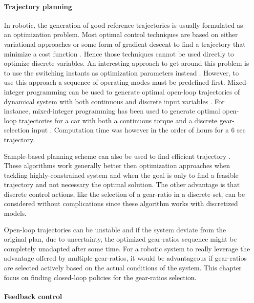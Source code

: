 \paragraph{Trajectory planning}

In robotic, the generation of good reference trajectories is usually formulated as an optimization problem. Most optimal control techniques are based on either variational approaches or some form of gradient descent to find a trajectory that minimize a cost function \cite{betts_practical_2010}. Hence those techniques cannot be used directly to optimize discrete variables. An interesting approach to get around this problem is to use the switching instants as optimization parameters instead \cite{xu_optimal_2004}\cite{majdoub_hybrid_2010}. However, to use this approach a sequence of operating modes must be predefined first. Mixed-integer programming can be used to generate optimal open-loop trajectories of dynamical system with both continuous and discrete input variables \cite{richards_spacecraft_2002}. For instance, mixed-integer programming has been used to generate optimal open-loop trajectories for a car with both a continuous torque and a discrete gear-selection input \cite{gerdts_solving_2005}. Computation time was however in the order of hours for a 6 sec trajectory. 

Sample-based planning scheme can also be used to find efficient trajectory \cite{lavalle_planning_2006}. These algorithms work generally better then optimization approaches when tackling highly-constrained system and when the goal is only to find a feasible trajectory and not necessary the optimal solution. The other advantage is that discrete control actions, like the selection of a gear-ratio in a discrete set, can be considered without complications since these algorithm works with discretized models.

Open-loop trajectories can be unstable and if the system deviate from the original plan, due to uncertainty, the optimized gear-ratios sequence might be completely unadapted after some time. For a robotic system to really leverage the advantage offered by multiple gear-ratios, it would be advantageous if gear-ratios are selected actively based on the actual conditions of the system. This chapter focus on finding closed-loop policies for the gear-ratios selection.

\paragraph{Feedback control}

